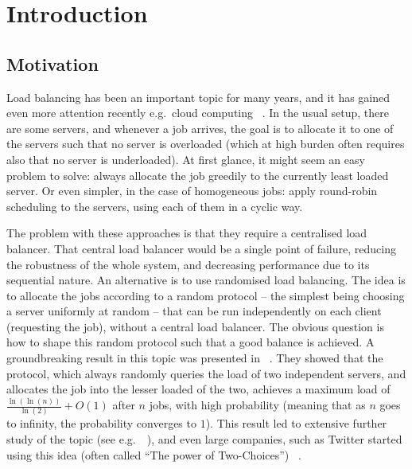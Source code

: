\chapter{Introduction}\label{introduction}

\ifpdf
    \graphicspath{{Chapter1/Figs/Raster/}{Chapter1/Figs/PDF/}{Chapter1/Figs/}}
\else
    \graphicspath{{Chapter1/Figs/Vector/}{Chapter1/Figs/}}
\fi


\section{Motivation}

Load balancing has been an important topic for many years, and it has gained even more attention recently e.g.\ cloud computing ~\cite{mishra2020cloud}. In the usual setup, there are some servers, and whenever a job arrives, the goal is to allocate it to one of the servers such that no server is overloaded (which at high burden often requires also that no server is underloaded). At first glance, it might seem an easy problem to solve: always allocate the job greedily to the currently least loaded server. Or even simpler, in the case of homogeneous jobs: apply round-robin scheduling to the servers, using each of them in a cyclic way. 

The problem with these approaches is that they require a centralised load balancer. That central load balancer would be a single point of failure, reducing the robustness of the whole system, and decreasing performance due to its sequential nature. An alternative is to use randomised load balancing. The idea is to allocate the jobs according to a random protocol -- the simplest being choosing a server uniformly at random -- that can be run independently on each client (requesting the job), without a central load balancer. The obvious question is how to shape this random protocol such that a good balance is achieved. A groundbreaking result in this topic was presented in ~\cite{azar1999twochoice}. They showed that the \TwoChoice protocol, which always randomly queries the load of two independent servers, and allocates the job into the lesser loaded of the two, achieves a maximum load of $\frac{\ln(\ln(n))}{\ln(2)} + O(1)$ after $n$ jobs, with high probability (meaning that as $n$ goes to infinity, the probability converges to $1$). This result led to extensive further study of the topic (see e.g.\ ~\cite{richa2001surveytwochoice}), and even large companies, such as Twitter started using this idea (often called ``The power of Two-Choices'') ~\cite{anderson2019twitter}.


